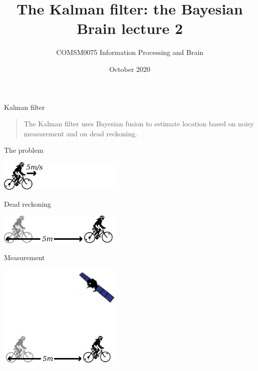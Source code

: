 \documentclass{beamer}
\title[The Bayesian Brain lecture 3]{The Kalman filter: the Bayesian Brain lecture 2}
\author{COMSM0075 Information Processing and Brain}
\institute{\texttt{comsm0075.github.io}}
\date{October 2020}
\begin{document}
\maketitle



\begin{frame}{Kalman filter}
  \begin{quote}
The Kalman filter uses Bayesian fusion to estimate location based on noisy measurement and on dead reckoning.
  \end{quote}

\end{frame}

\begin{frame}{The problem}
\begin{center}
\includegraphics[width=6cm]{cyclist1.png}
\end{center}
\end{frame}


\begin{frame}{Dead reckoning}
\begin{center}
\includegraphics[width=6cm]{cyclist2.png}
\end{center}
\end{frame}


\begin{frame}{Measurement}
\begin{center}
\includegraphics[width=6cm]{cyclist_gps.png}
\end{center}
\end{frame}
\end{document}
